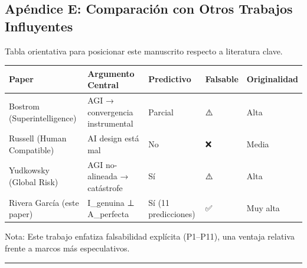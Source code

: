 \subsection{Apéndice E: Comparación con Otros Trabajos
Influyentes}\label{apuxe9ndice-e-comparaciuxf3n-con-otros-trabajos-influyentes}

Tabla orientativa para posicionar este manuscrito respecto a literatura
clave.

{\def\LTcaptype{none} %
\begin{longtable}[]{@{}
  >{\raggedright\arraybackslash}p{}
  >{\raggedright\arraybackslash}p{}
  >{\raggedright\arraybackslash}p{}
  >{\raggedright\arraybackslash}p{}
  >{\raggedright\arraybackslash}p{}@{}}
\toprule\noalign{}
\begin{minipage}[b]{\linewidth}\raggedright
Paper
\end{minipage} & \begin{minipage}[b]{\linewidth}\raggedright
Argumento Central
\end{minipage} & \begin{minipage}[b]{\linewidth}\raggedright
Predictivo
\end{minipage} & \begin{minipage}[b]{\linewidth}\raggedright
Falsable
\end{minipage} & \begin{minipage}[b]{\linewidth}\raggedright
Originalidad
\end{minipage} \\
\midrule\noalign{}
\endhead
\bottomrule\noalign{}
\endlastfoot
Bostrom (Superintelligence) & AGI → convergencia instrumental & Parcial
& ⚠️ & Alta \\
Russell (Human Compatible) & AI design está mal & No & ❌ & Media \\
Yudkowsky (Global Risk) & AGI no-alineada → catástrofe & Sí & ⚠️ &
Alta \\
Rivera García (este paper) & I\_genuina ⊥ A\_perfecta & Sí (11
predicciones) & ✅ & Muy alta \\
\end{longtable}
}

Nota: Este trabajo enfatiza falsabilidad explícita (P1--P11), una
ventaja relativa frente a marcos más especulativos.

\begin{center}\rule{0.5\linewidth}{0.5pt}\end{center}

